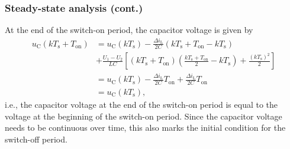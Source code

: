 \begin{frame}
    \frametitle{Steady-state analysis (cont.)}
    At the end of the switch-on period, the capacitor voltage is given by
    \begin{equation}
        \begin{split}
            u_\mathrm{C}(k T_\mathrm{s} + T_\mathrm{on}) &= u_\mathrm{C}(k T_\mathrm{s}) -\frac{\Delta i_\mathrm{L}}{2 C}(k T_\mathrm{s} + T_\mathrm{on}- kT_\mathrm{s}) \\&+ \frac{U_1-U_2}{LC} \left[(k T_\mathrm{s} + T_\mathrm{on})(\frac{k T_\mathrm{s} + T_\mathrm{on}}{2}-kT_\mathrm{s}) + \frac{(kT_\mathrm{s})^2}{2}\right]\\
            &= u_\mathrm{C}(k T_\mathrm{s}) - \frac{\Delta i_\mathrm{L}}{2 C}T_\mathrm{on} +\frac{\Delta i_\mathrm{L}}{2 C}T_\mathrm{on}\\
            &= u_\mathrm{C}(k T_\mathrm{s}),
        \end{split}
        \label{eq:capacitor-voltage-switch-on-step-down-converter-end}
    \end{equation}
    i.e., the capacitor voltage at the end of the switch-on period is equal to the voltage at the beginning of the switch-on period. Since the capacitor voltage needs to be continuous over time, this also marks the initial condition for the switch-off period.
\end{frame}

